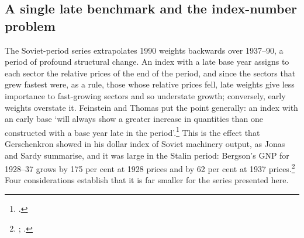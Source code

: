 \subsection{A single late benchmark and the index-number problem}

The Soviet-period series extrapolates 1990 weights backwards over 1937--90, a period of profound structural change. An index with a late base year assigns to each sector the relative prices of the end of the period, and since the sectors that grew fastest were, as a rule, those whose relative prices fell, late weights give less importance to fast-growing sectors and so understate growth; conversely, early weights overstate it. Feinstein and Thomas put the point generally: an index with an early base `will always show a greater increase in quantities than one constructed with a base year late in the period'.\footnote{\autocite[516]{feinsteinthomas2002}.} This is the effect that Gerschenkron showed in his dollar index of Soviet machinery output, as Jonas and Sardy summarise, and it was large in the Stalin period: Bergson's GNP for 1928--37 grows by 175 per cent at 1928 prices and by 62 per cent at 1937 prices.\footnote{\autocite[82--3]{jonassardy1970}; \autocite[517]{feinsteinthomas2002}.} Four considerations establish that it is far smaller for the series presented here.

